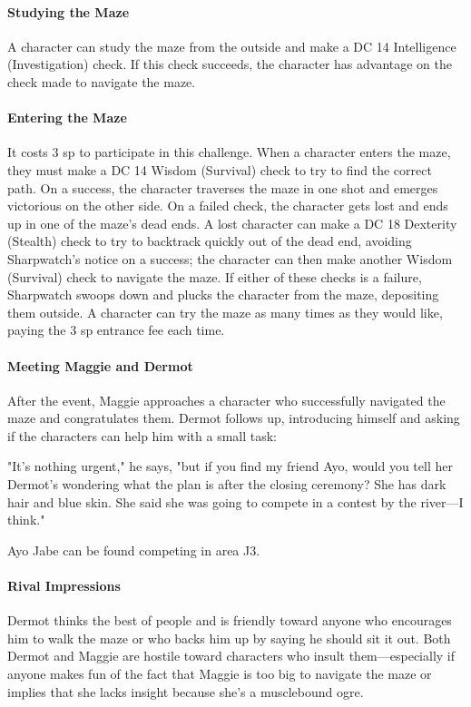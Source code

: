 \documentclass[10pt,a4,twoside,twocolumn,openany,nodeprecatedcode]{dndbook}
\begin{document}
\paragraph{Studying the Maze}
A character can study the maze from the outside and make a DC 14 Intelligence (Investigation) check. If this check succeeds, the character has advantage on the check made to navigate the maze.
\paragraph{Entering the Maze}
It costs 3 sp to participate in this challenge. When a character enters the maze, they must make a DC 14 Wisdom (Survival) check to try to find the correct path. On a success, the character traverses the maze in one shot and emerges victorious on the other side.
On a failed check, the character gets lost and ends up in one of the maze's dead ends. A lost character can make a DC 18 Dexterity (Stealth) check to try to backtrack quickly out of the dead end, avoiding Sharpwatch's notice on a success; the character can then make another Wisdom (Survival) check to navigate the maze. If either of these checks is a failure, Sharpwatch swoops down and plucks the character from the maze, depositing them outside.
A character can try the maze as many times as they would like, paying the 3 sp entrance fee each time.
\paragraph{Meeting Maggie and Dermot}
After the event, Maggie approaches a character who successfully navigated the maze and congratulates them. Dermot follows up, introducing himself and asking if the characters can help him with a small task:
\begin{DndReadAloud}{}
"It's nothing urgent," he says, "but if you find my friend Ayo, would you tell her Dermot's wondering what the plan is after the closing ceremony? She has dark hair and blue skin. She said she was going to compete in a contest by the river—I think."
\end{DndReadAloud}

Ayo Jabe can be found competing in area J3.
\paragraph{Rival Impressions}
Dermot thinks the best of people and is friendly toward anyone who encourages him to walk the maze or who backs him up by saying he should sit it out. Both Dermot and Maggie are hostile toward characters who insult them—especially if anyone makes fun of the fact that Maggie is too big to navigate the maze or implies that she lacks insight because she's a musclebound ogre.
\end{document}
